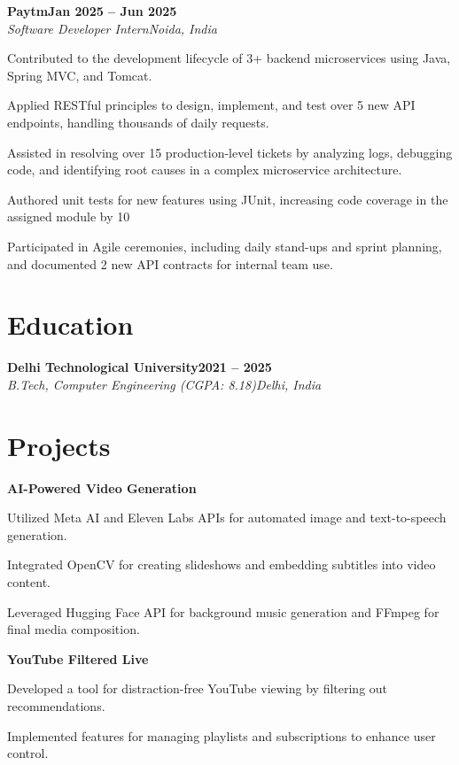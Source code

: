 \documentclass[letterpaper,10pt]{article}
\newcommand{\heading}[2]{
  \hspace{10pt}#1\hfill#2\\
}
\newcommand{\headingBf}[2]{
  \heading{\textbf{#1}}{\textbf{#2}}
}
\newcommand{\headingIt}[2]{
  \heading{\textit{#1}}{\textit{#2}}
}
\newenvironment{resume_list}{
  \vspace{-7pt}
  \begin{itemize}[itemsep=-2px, parsep=1pt, leftmargin=30pt]
}{
  \end{itemize}
}
\begin{document}
  \headingBf{Paytm}{Jan 2025 -- Jun 2025}
  \headingIt{Software Developer Intern}{Noida, India}
    \begin{resume_list}
        \item Contributed to the development lifecycle of 3+ backend microservices using Java, Spring MVC, and Tomcat.
        \item Applied RESTful principles to design, implement, and test over 5 new API endpoints, handling thousands of daily requests.
        \item Assisted in resolving over 15 production-level tickets by analyzing logs, debugging code, and identifying root causes in a complex microservice architecture.
        \item Authored unit tests for new features using JUnit, increasing code coverage in the assigned module by 10%
        \item Participated in Agile ceremonies, including daily stand-ups and sprint planning, and documented 2 new API contracts for internal team use.
    \end{resume_list}

  \section{Education}
  \headingBf{Delhi Technological University}{2021 -- 2025}
  \headingIt{B.Tech, Computer Engineering (CGPA: 8.18)}{Delhi, India}

  \section{Projects}
  \headingBf{AI-Powered Video Generation}{\href{https://github.com/SaeidAnwar/Script-to-Video-Generator}{\faGithub}}
  \begin{resume_list}
    \item Utilized Meta AI and Eleven Labs APIs for automated image and text-to-speech generation.
    \item Integrated OpenCV for creating slideshows and embedding subtitles into video content.
    \item Leveraged Hugging Face API for background music generation and FFmpeg for final media composition.
  \end{resume_list}

  \headingBf{YouTube Filtered Live}{\href{https://github.com/wevdebelopers/Youtube_Filter}{\faGithub}}
  \begin{resume_list}
    \item Developed a tool for distraction-free YouTube viewing by filtering out recommendations.
    \item Implemented features for managing playlists and subscriptions to enhance user control.
  \end{resume_list}
\end{document}
